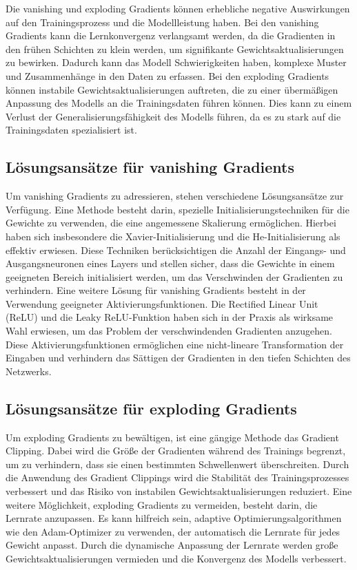     Die vanishing und exploding Gradients können erhebliche negative Auswirkungen auf den Trainingsprozess und die Modellleistung haben. 
    Bei den vanishing Gradients kann die Lernkonvergenz verlangsamt werden, da die Gradienten in den frühen Schichten zu klein werden, um signifikante Gewichtsaktualisierungen zu bewirken. 
    Dadurch kann das Modell Schwierigkeiten haben, komplexe Muster und Zusammenhänge in den Daten zu erfassen.
    Bei den exploding Gradients können instabile Gewichtsaktualisierungen auftreten, die zu einer übermäßigen Anpassung des Modells an die Trainingsdaten führen können. 
    Dies kann zu einem Verlust der Generalisierungsfähigkeit des Modells führen, da es zu stark auf die Trainingsdaten spezialisiert ist.

\subsection{Lösungsansätze für vanishing Gradients}

    Um vanishing Gradients zu adressieren, stehen verschiedene Lösungsansätze zur Verfügung. 
    Eine Methode besteht darin, spezielle Initialisierungstechniken für die Gewichte zu verwenden, die eine angemessene Skalierung ermöglichen. 
    Hierbei haben sich insbesondere die Xavier-Initialisierung und die He-Initialisierung als effektiv erwiesen. 
    Diese Techniken berücksichtigen die Anzahl der Eingangs- und Ausgangsneuronen eines Layers und stellen sicher, dass die Gewichte in einem geeigneten Bereich initialisiert werden, um das Verschwinden der Gradienten zu verhindern.
    Eine weitere Lösung für vanishing Gradients besteht in der Verwendung geeigneter Aktivierungsfunktionen. 
    Die Rectified Linear Unit (ReLU) und die Leaky ReLU-Funktion haben sich in der Praxis als wirksame Wahl erwiesen, um das Problem der verschwindenden Gradienten anzugehen. 
    Diese Aktivierungsfunktionen ermöglichen eine nicht-lineare Transformation der Eingaben und verhindern das Sättigen der Gradienten in den tiefen Schichten des Netzwerks.

\subsection{Lösungsansätze für exploding Gradients}

    Um exploding Gradients zu bewältigen, ist eine gängige Methode das Gradient Clipping. 
    Dabei wird die Größe der Gradienten während des Trainings begrenzt, um zu verhindern, dass sie einen bestimmten Schwellenwert überschreiten. 
    Durch die Anwendung des Gradient Clippings wird die Stabilität des Trainingsprozesses verbessert und das Risiko von instabilen Gewichtsaktualisierungen reduziert.
    Eine weitere Möglichkeit, exploding Gradients zu vermeiden, besteht darin, die Lernrate anzupassen. 
    Es kann hilfreich sein, adaptive Optimierungsalgorithmen wie den Adam-Optimizer zu verwenden, der automatisch die Lernrate für jedes Gewicht anpasst. 
    Durch die dynamische Anpassung der Lernrate werden große Gewichtsaktualisierungen vermieden und die Konvergenz des Modells verbessert.

